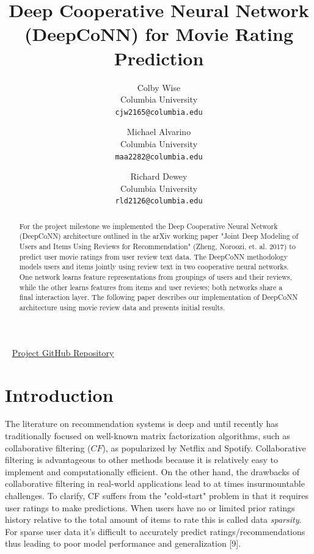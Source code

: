 \documentclass[10pt,twocolumn,letterpaper]{article}
\begin{document}
\title{Deep Cooperative Neural Network (DeepCoNN) for Movie Rating Prediction}

\author{Colby Wise\\
Columbia University\\
{\tt\small cjw2165@columbia.edu}
\and
Michael Alvarino\\
Columbia University\\
{\tt\small maa2282@columbia.edu}
\and
Richard Dewey\\
Columbia University\\
{\tt\small rld2126@columbia.edu}
}

\maketitle

\begin{abstract}
   For the project milestone we implemented the Deep Cooperative Neural Network (DeepCoNN) 
   architecture outlined in the arXiv working paper 
   "Joint Deep Modeling of Users and Items Using Reviews for Recommendation" 
   (Zheng, Noroozi, et. al. 2017) to predict user movie ratings from user review text data. 
   The DeepCoNN methodology models users and items jointly using review text in two cooperative neural networks.
   One network learns feature representations from groupings of users and their reviews, while the other learns
   features from items and user reviews; both networks share a final interaction layer. The following paper
   describes our implementation of DeepCoNN architecture using movie review data and presents 
   initial results.
\end{abstract}
\ \newline
\href{https://github.com/michaelAlvarino/Deep-Learning}{Project GitHub Repository}

\section{Introduction}

\par The literature on recommendation systems is deep and until recently has traditionally focused on well-known matrix factorization algorithms, such as collaborative filtering ($CF$), as popularized by Netflix and Spotify. Collaborative filtering is advantageous to other methods because it is relatively easy to implement and computationally efficient. On the other hand, the drawbacks of collaborative filtering in real-world applications lead to at times insurmountable challenges. To clarify, CF suffers from the "cold-start" problem in that it requires user ratings to make predictions. When users have no or limited prior ratings history relative to the total amount of items to rate this is called data \textit{sparsity}. For sparse user data it's difficult to accurately predict ratings/recommendations thus leading to poor model performance and generalization [9]. 
\end{document}
